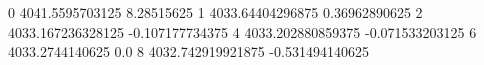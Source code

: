 0 4041.5595703125 8.28515625
1 4033.64404296875 0.36962890625
2 4033.167236328125 -0.107177734375
4 4033.202880859375 -0.071533203125
6 4033.2744140625 0.0
8 4032.742919921875 -0.531494140625
